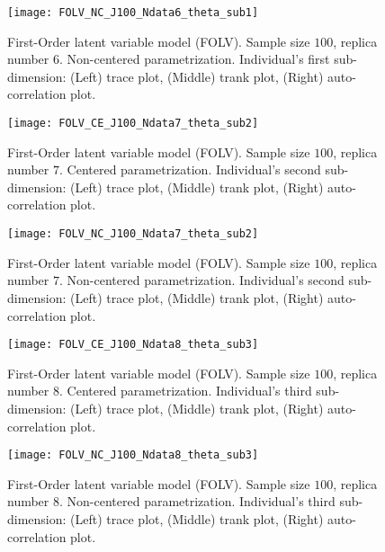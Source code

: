 %
\begin{figure}[H]
	\centering
	\texttt{[image: FOLV\_NC\_J100\_Ndata6\_theta\_sub1]}
	\caption[First-Order latent variable model (FOLV). Sample size $100$, replica number $6$. Non-centered parametrization. Individual's first sub-dimension. Trace, trank and auto-correlation plots.]%
	{First-Order latent variable model (FOLV). Sample size $100$, replica number $6$. Non-centered parametrization. Individual's first sub-dimension: (Left) trace plot, (Middle) trank plot, (Right) auto-correlation plot.}
	\label{fig:FOLV_NC_chains4}
\end{figure}
%
\begin{figure}[H]
	\centering
	\texttt{[image: FOLV\_CE\_J100\_Ndata7\_theta\_sub2]}
	\caption[First-Order latent variable model (FOLV). Sample size $100$, replica number $7$. Centered parametrization. Individual's second sub-dimension. Trace, trank and auto-correlation plots.]%
	{First-Order latent variable model (FOLV). Sample size $100$, replica number $7$. Centered parametrization. Individual's second sub-dimension: (Left) trace plot, (Middle) trank plot, (Right) auto-correlation plot.}
	\label{fig:FOLV_CE_chains5}
\end{figure}
%
\begin{figure}[H]
	\centering
	\texttt{[image: FOLV\_NC\_J100\_Ndata7\_theta\_sub2]}
	\caption[First-Order latent variable model (FOLV). Sample size $100$, replica number $7$. Non-centered parametrization. Individual's second sub-dimension. Trace, trank and auto-correlation plots.]%
	{First-Order latent variable model (FOLV). Sample size $100$, replica number $7$. Non-centered parametrization. Individual's second sub-dimension: (Left) trace plot, (Middle) trank plot, (Right) auto-correlation plot.}
	\label{fig:FOLV_NC_chains5}
\end{figure}
%
\begin{figure}[H]
	\centering
	\texttt{[image: FOLV\_CE\_J100\_Ndata8\_theta\_sub3]}
	\caption[First-Order latent variable model (FOLV). Sample size $100$, replica number $8$. Centered parametrization. Individual's third sub-dimension. Trace, trank and auto-correlation plots.]%
	{First-Order latent variable model (FOLV). Sample size $100$, replica number $8$. Centered parametrization. Individual's third sub-dimension: (Left) trace plot, (Middle) trank plot, (Right) auto-correlation plot.}
	\label{fig:FOLV_CE_chains6}
\end{figure}
%
\begin{figure}[H]
	\centering
	\texttt{[image: FOLV\_NC\_J100\_Ndata8\_theta\_sub3]}
	\caption[First-Order latent variable model (FOLV). Sample size $100$, replica number $8$. Non-centered parametrization. Individual's third sub-dimension. Trace, trank and auto-correlation plots.]%
	{First-Order latent variable model (FOLV). Sample size $100$, replica number $8$. Non-centered parametrization. Individual's third sub-dimension: (Left) trace plot, (Middle) trank plot, (Right) auto-correlation plot.}
	\label{fig:FOLV_NC_chains6}
\end{figure}
